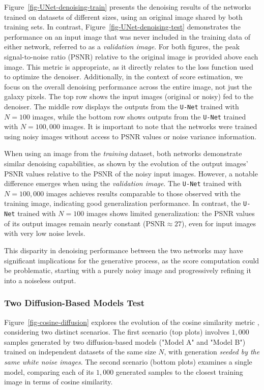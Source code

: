 \documentclass[fleqn,usenatbib]{mnras}
\begin{document}
Figure~\ref{fig-UNet-denoising-train} presents the denoising results of the networks trained on datasets of different sizes, using an original image shared by both training sets. In contrast, Figure~\ref{fig-UNet-denoising-test} demonstrates the performance on an input image that was never included in the training data of either network, referred to as a \textit{validation image}. For both figures, the peak signal-to-noise ratio (PSNR) relative to the original image is provided above each image. {\color{red} This metric is appropriate, as it directly relates to the loss function used to optimize the denoiser. Additionally, in the context of score estimation, we focus on the overall denoising performance across the entire image, not just the galaxy pixels.} The top row shows the input images (original or noisy) fed to the denoiser. The middle row displays the outputs from the \texttt{U-Net} trained with $N=100$ images, while the bottom row shows outputs from the \texttt{U-Net} trained with $N=100,000$ images. It is important to note that the networks were trained using noisy images without access to PSNR values or noise variance information.


When using an image from the \textit{training} dataset, both networks demonstrate similar denoising capabilities, as shown by the evolution of the output images' PSNR values relative to the PSNR of the noisy input images. However, a notable difference emerges when using the \textit{validation image}. The \texttt{U-Net} trained with $N=100,000$ images achieves results comparable to those observed with the training image, indicating good generalization performance. In contrast, the \texttt{U-Net} trained with $N=100$ images shows limited generalization: the PSNR values of its output images remain nearly constant ($\mathrm{PSNR} \approx 27$), even for input images with very low noise levels. 

{\color{red}This disparity in denoising performance between the two networks may have significant implications for the generative process, as the score computation could be problematic, starting with a purely noisy image and progressively refining it into a noiseless output.}
%
\subsubsection{Two Diffusion-Based Models Test}
\label{sec-two_models-Diffusion}
%
Figure~\ref{fig-cosine-diffusion} explores the evolution of the cosine similarity metric \citep{books/aw/TanSK2005}, considering two distinct scenarios. The first scenario (top plots) involves $1,000$ samples generated by two diffusion-based models ("Model A" and "Model B") trained on independent datasets of the same size $N$, with generation \textit{seeded by the same white noise images}. The second scenario (bottom plots) examines a single model, comparing each of its $1,000$ generated samples to the closest training image in terms of cosine similarity.
\end{document}
